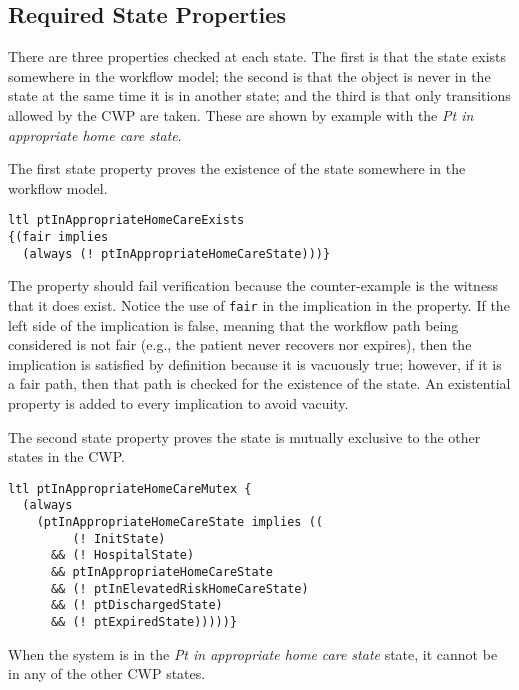 \begin{comment}
The term \emph{fair} is a reference to the over-approximating nature of the workflow model.
Indeed, in considering the workflow in \figref{fig:bpmn}, it is possible that a patient is never discharged or that the patient never expires.
Such a behavior is \emph{not fair} because it is not emblematic of the real world---patients eventually are discharged or expire.
As such, the property proves the existence of paths in the workflow that end in the goal states, and this same property is used later to restrict verification to only those paths that end in one of goal states thereby excluding from consideration, in verification, any infinite workflow behaviors where the patient never recovers or expires.
\end{comment}

\subsection{Required State Properties}
There are three properties checked at each state.
The first is that the state exists somewhere in the workflow model;
the second is that the object is never in the state at the same time it is in another state;
and the third is that only transitions allowed by the CWP are taken.
These are shown by example with the \emph{Pt in appropriate home care state}.

The first state property proves the existence of the state somewhere in the workflow model.
%
{\small
\begin{lstlisting}[style=myPromela]
ltl ptInAppropriateHomeCareExists 
{(fair implies 
  (always (! ptInAppropriateHomeCareState)))}
\end{lstlisting}
}
%
\noindent The property should fail verification because the counter-example is the witness that it does exist.
Notice the use of \texttt{fair} in the implication in the property.
If the left side of the implication is false, meaning that the workflow path being considered is not fair (e.g., the patient never recovers nor expires), then the implication is satisfied by definition because it is vacuously true;
however, if it is a fair path, then that path is checked for the existence of the state.
An existential property is added to every implication to avoid vacuity.

The second state property proves the state is mutually exclusive to the other states in the CWP.
%
{\small
\begin{lstlisting}[style=myPromela]
ltl ptInAppropriateHomeCareMutex {
  (always 
    (ptInAppropriateHomeCareState implies ((
         (! InitState) 
      && (! HospitalState) 
      && ptInAppropriateHomeCareState 
      && (! ptInElevatedRiskHomeCareState) 
      && (! ptDischargedState) 
      && (! ptExpiredState)))))}
\end{lstlisting}
}
%
\noindent When the system is in the \emph{Pt in appropriate home care state} state, it cannot be in any of the other CWP states. 

